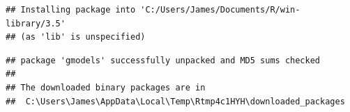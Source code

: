 \documentclass[]{article}
\newenvironment{Shaded}{\begin{snugshade}}{\end{snugshade}}
\newcommand{\KeywordTok}[1]{\textcolor[rgb]{0.13,0.29,0.53}{\textbf{#1}}}
\newcommand{\StringTok}[1]{\textcolor[rgb]{0.31,0.60,0.02}{#1}}
\newcommand{\OperatorTok}[1]{\textcolor[rgb]{0.81,0.36,0.00}{\textbf{#1}}}
\newcommand{\NormalTok}[1]{#1}
\begin{document}
\begin{verbatim}
## Installing package into 'C:/Users/James/Documents/R/win-library/3.5'
## (as 'lib' is unspecified)
\end{verbatim}

\begin{verbatim}
## package 'gmodels' successfully unpacked and MD5 sums checked
## 
## The downloaded binary packages are in
##  C:\Users\James\AppData\Local\Temp\Rtmp4c1HYH\downloaded_packages
\end{verbatim}

\begin{Shaded}
\end{Shaded}
\end{document}
